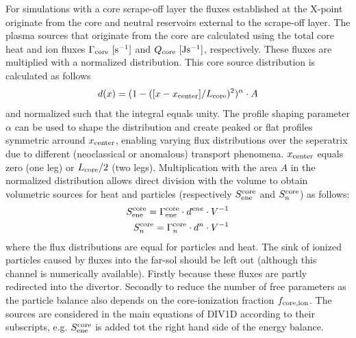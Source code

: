 \documentclass[amsmath,amssymb,a4]{revtex4-2}
\begin{document}
For simulations with a core scrape-off layer the fluxes established at the X-point originate from the core and neutral reservoirs external to the scrape-off layer. The plasma sources that originate from the core are calculated using the total core heat and ion fluxes $\Gamma_{\rm core}~\mathrm{[ s^{-1}]}$ and $Q_{\rm core}~\mathrm{[J s^{-1}]}$, respectively. These fluxes are multiplied with a normalized distribution.
This core source distribution is calculated as follows
\begin{equation}
    d(x) = (1 - ([x-x_{\rm center}]/L_{\rm core})^2)^{\alpha} \cdot A
\end{equation}
and normalized such that the integral equals unity. The profile shaping parameter $\alpha$ can be used to shape the distribution and create peaked or flat profiles symmetric arround $x_{\rm center}$, enabling varying flux distributions over the seperatrix due to different (neoclassical or anomalous) transport phenomena. $x_{\rm center}$ equals zero (one leg) or $L_{\rm core}/2$ (two legs). Multiplication with the area $A$ in the normalized distribution allows direct division with the volume to obtain volumetric sources for heat and particles (respectively $S_{\rm ene}^{\rm core} $ and $S_{n}^{\rm core}$) as follows:
\begin{equation}
\begin{aligned}
    S_{\rm ene}^{\rm core} = \Gamma_{{\rm ene}}^{\rm core} \cdot d^{ene} \cdot  V^{-1} \\
    S_{n}^{\rm core} = \Gamma_{n}^{\rm core} \cdot d^n \cdot  V^{-1} 
    \end{aligned}
\end{equation}
where the flux distributions are equal for particles and heat. The sink of ionized particles caused by fluxes into the far-sol should be left out (although this channel is numerically available). Firstly because these fluxes are partly redirected into the divertor. Secondly to reduce the number of free parameters as the particle balance also depends on the core-ionization fraction $f_{\rm core,ion}$. The sources are considered in the main equations of DIV1D according to their subscripts, e.g. $S_{\rm ene}^{\rm core}$ is added tot the right hand side of the energy balance.
\end{document}
